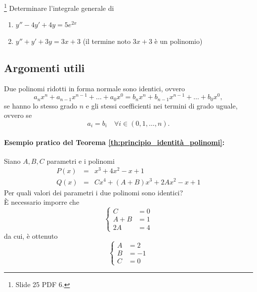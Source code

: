 \begin{exercise}\footnote{Slide 25 PDF 6.}
	Determinare l'integrale generale di
	\begin{enumerate}
		\item $y'' - 4y' + 4y = 5 e^{2x}$
		\item $y'' + y' + 3y = 3x + 3$ (il termine noto $3x + 3$ è un polinomio)
	\end{enumerate}
\end{exercise}


\subsection{Argomenti utili}
\begin{theorem}\label{th:principio_identità_polinomi}
		Due polinomi ridotti in forma normale sono identici, ovvero
		\begin{equation*}
			a_nx^n+a_{n-1}x^{n-1}+\hdots+a_0x^0 = b_nx^n+b_{n-1}x^{n-1}+\hdots+b_0x^0,
		\end{equation*}
		se hanno lo stesso grado $n$ e gli stessi coefficienti nei termini di grado uguale, ovvero se
		\begin{equation*}
			a_i=b_i\quad\forall i\in(0,1,\hdots, n).
		\end{equation*}
\end{theorem}
\paragraph{Esempio pratico del Teorema \ref{th:principio_identità_polinomi}:} Siano $A,B,C$ parametri e i \gls{polinomi}
\begin{equation*}
	\begin{matrix}
		P(x) &=& x^3 + 4x^2-x+1\\
		Q(x) &=& Cx^4 + (A+B)x^3+2Ax^2-x+1
	\end{matrix}
\end{equation*}
Per quali valori dei parametri i due polinomi sono identici?\\
È necessario imporre che
\begin{equation*}
	\begin{cases}
		C&=0\\
		A+B &= 1\\
		2A &= 4
	\end{cases}
\end{equation*}
da cui, è ottenuto
\begin{equation*}
	\begin{cases}
		A &= 2\\
		B &= - 1\\
		C&=0
	\end{cases}
\end{equation*}

